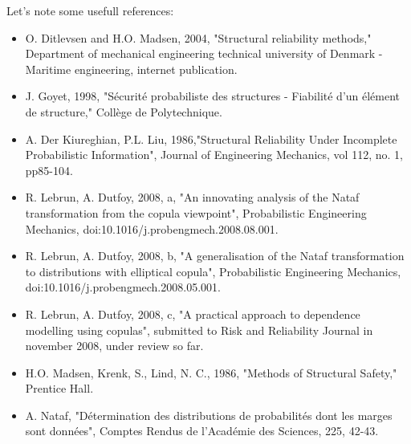{            Let's note some usefull references:
            \begin{itemize}
            \item O. Ditlevsen and H.O. Madsen, 2004, "Structural reliability methods," Department of mechanical engineering technical university of Denmark - Maritime engineering, internet publication.
            \item J. Goyet, 1998, "Sécurité probabiliste des structures - Fiabilité d'un élément de structure," Collège de Polytechnique.
            \item A. Der Kiureghian, P.L. Liu, 1986,"Structural Reliability Under Incomplete Probabilistic Information", Journal of Engineering Mechanics, vol 112, no. 1, pp85-104.
            \item R. Lebrun, A. Dutfoy, 2008, a, "An innovating analysis of the Nataf transformation from the copula viewpoint", Probabilistic  Engineering Mechanics, doi:10.1016/j.probengmech.2008.08.001.
            \item R. Lebrun, A. Dutfoy, 2008, b, "A generalisation of the Nataf transformation to distributions with elliptical copula", Probabilistic  Engineering Mechanics, doi:10.1016/j.probengmech.2008.05.001.
            \item R. Lebrun, A. Dutfoy, 2008, c, "A practical approach to dependence modelling using copulas", submitted to Risk and Reliability Journal in november 2008, under review so far.
            \item  H.O. Madsen, Krenk, S., Lind, N. C., 1986, "Methods of Structural Safety," Prentice Hall.
            \item  A. Nataf, "Détermination des distributions de probabilités dont les marges sont données", Comptes Rendus de l'Académie des Sciences, 225, 42-43.
            \end{itemize}


            }

